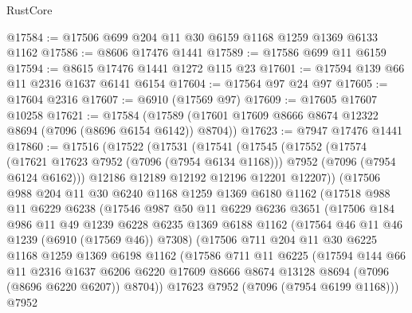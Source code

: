 \begin{lexlean}{RustCore}
\begin{coremodule}
@17584 := @17506 @699 @204 @11 @30 @6159 @1168 @1259 @1369 @6133 @1162
@17586 := @8606 @17476 @1441
@17589 := @17586 @699 @11 @6159
@17594 := @8615 @17476 @1441 @1272 @115 @23
@17601 := @17594 @139 @66 @11 @2316 @1637 @6141 @6154
@17604 := @17564 @97 @24 @97
@17605 := @17604 @2316
@17607 := @6910 (@17569 @97)
@17609 := @17605 @17607 @10258
@17621 := @17584 (@17589 (@17601 @17609 @8666 @8674 @12322 @8694 (@7096 (@8696 @6154 @6142)) @8704))
@17623 := @7947 @17476 @1441
@17860 := @17516
    (@17522
      (@17531
        (@17541
          (@17545
            (@17552
              (@17574
                (@17621 @17623 @7952 (@7096 (@7954 @6134 @1168)))
                @7952
                (@7096 (@7954 @6124 @6162)))
              @12186
              @12189
              @12192
              @12196
              @12201
              @12207))
          (@17506
            @988
            @204
            @11
            @30
            @6240
            @1168
            @1259
            @1369
            @6180
            @1162
            (@17518
              @988
              @11
              @6229
              @6238
              (@17546
                @987
                @50
                @11
                @6229
                @6236
                @3651
                (@17506
                  @184
                  @986
                  @11
                  @49
                  @1239
                  @6228
                  @6235
                  @1369
                  @6188
                  @1162
                  (@17564 @46 @11 @46 @1239 (@6910 (@17569 @46)) @7308)
                  (@17506
                    @711
                    @204
                    @11
                    @30
                    @6225
                    @1168
                    @1259
                    @1369
                    @6198
                    @1162
                    (@17586
                      @711
                      @11
                      @6225
                      (@17594
                        @144
                        @66
                        @11
                        @2316
                        @1637
                        @6206
                        @6220
                        @17609
                        @8666
                        @8674
                        @13128
                        @8694
                        (@7096 (@8696 @6220 @6207))
                        @8704))
                    @17623
                    @7952
                    (@7096 (@7954 @6199 @1168)))
                  @7952

\end{coremodule}
\end{lexlean}
